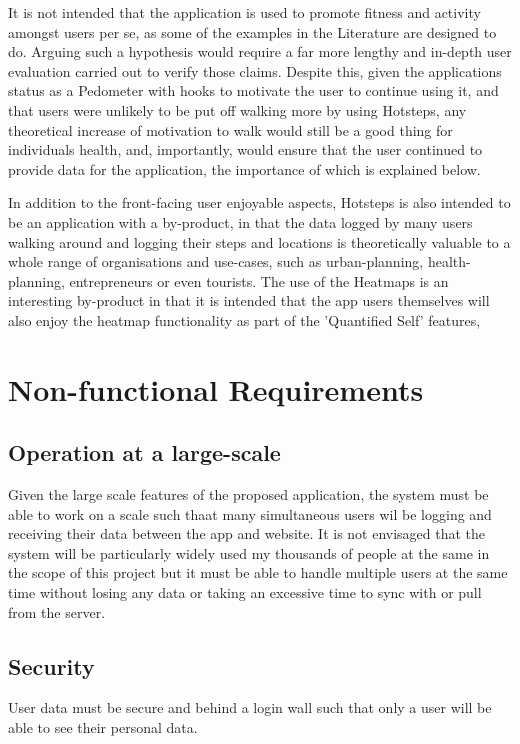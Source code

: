 \documentclass{l4proj}
\begin{document}
It is not intended that the application is used to promote fitness and activity amongst users per se, as some of the examples in the Literature are designed to do. Arguing such a hypothesis would require a far more lengthy and in-depth user evaluation carried out to verify those claims. Despite this, given the applications status as a Pedometer with hooks to motivate the user to continue using it, and that users were unlikely to be put off walking more by using Hotsteps, any theoretical increase of motivation to walk would still be a good thing for individuals health, and, importantly, would ensure that the user continued to provide data for the application, the importance of which is explained below.

In addition to the front-facing user enjoyable aspects, Hotsteps is also intended to be an application with a by-product, in that the data logged by many users walking around and logging their steps and locations is theoretically valuable to a whole range of organisations and use-cases, such as urban-planning, health-planning, entrepreneurs or even tourists. The use of the Heatmaps is an interesting by-product in that it is intended that the app users themselves will also enjoy the heatmap functionality as part of the 'Quantified Self' features, 

\section{Non-functional Requirements}

\subsection{Operation at a large-scale}

Given the large scale features of the proposed application, the system must be able to work on a scale such thaat many simultaneous users  wil be logging and receiving their data between the app and website. It is not envisaged that the system will be particularly widely used my thousands of people at the same in the scope of this project but it must be able to handle multiple users at the same time without losing any data or taking an excessive time to sync with or pull from the server. 

\subsection{Security}

User data must be secure and behind a login wall such that only a user will be able to see their personal data.
\end{document}
